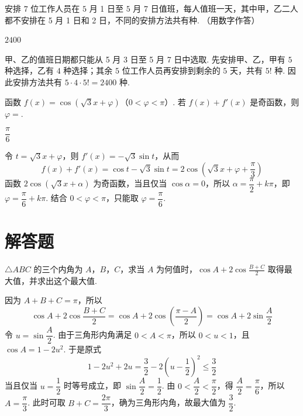 \begin{problem}
安排 \(7\) 位工作人员在 \(5\) 月 1 日至 \(5\) 月 7 日值班，每人值班一天，其中甲，乙二人都不安排在 5 月 1 日和 2 日，不同的安排方法共有\fillinblank{}种. （用数字作答）
\end{problem}

\begin{answer}
\(2400\)
\end{answer}

\begin{solution}
甲、乙的值班日期都只能从 5 月 3 日至 5 月 7 日中选取. 先安排甲、乙，甲有 \(5\) 种选择，乙有 \(4\) 种选择；其余 \(5\) 位工作人员再安排到剩余的 \(5\) 天，共有 \(5!\) 种. 因此安排方法共有 \(5\cdot4\cdot5!=2400\) 种.
\end{solution}

\begin{problem}
函数 \(f(x)=\cos(\sqrt3x+\varphi)\)（\(0<\varphi<\pi\)）. 若 \(f(x)+f'(x)\) 是奇函数，则 \(\varphi=\)\fillinblank{}.
\end{problem}

\begin{answer}
\(\dfrac{\pi}{6}\)
\end{answer}

\begin{solution}
令 \(t=\sqrt3x+\varphi\)，则 \(f'(x)=-\sqrt3\sin t\)，从而
\[
f(x)+f'(x)=\cos t-\sqrt3\sin t=2\cos\left(\sqrt3x+\varphi+\frac{\pi}{3}\right)
\]
函数 \(2\cos(\sqrt3x+\alpha)\) 为奇函数，当且仅当 \(\cos\alpha=0\)，所以 \(\alpha=\dfrac{\pi}{2}+k\pi\)，即 \(\varphi=\dfrac{\pi}{6}+k\pi\). 结合 \(0<\varphi<\pi\)，只能取 \(\varphi=\dfrac{\pi}{6}\).
\end{solution}

\section{解答题}

\begin{problem}
\(\triangle ABC\) 的三个内角为 \(A\)，\(B\)，\(C\)，求当 \(A\) 为何值时，\(\cos A+2\cos\frac{B+C}{2}\) 取得最大值，并求出这个最大值.
\end{problem}

\begin{solution}
因为 \(A+B+C=\pi\)，所以
\[
\cos A+2\cos\frac{B+C}{2}=\cos A+2\cos\left(\frac{\pi-A}{2}\right)=\cos A+2\sin\frac A2
\]
令 \(u=\sin\dfrac A2\). 由于三角形内角满足 \(0<A<\pi\)，所以 \(0<u<1\)，且 \(\cos A=1-2u^2\). 于是原式
\[
1-2u^2+2u=\frac32-2\left(u-\frac12\right)^2\leq\frac32
\]
当且仅当 \(u=\dfrac12\) 时等号成立，即 \(\sin\dfrac A2=\dfrac12\). 由 \(0<\dfrac A2<\dfrac{\pi}{2}\)，得 \(\dfrac A2=\dfrac{\pi}{6}\)，所以 \(A=\dfrac{\pi}{3}\). 此时可取 \(B+C=\dfrac{2\pi}{3}\)，确为三角形内角，故最大值为 \(\dfrac32\).
\end{solution}

